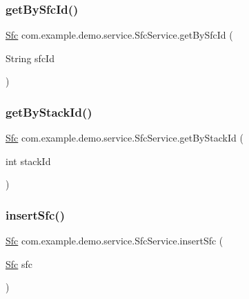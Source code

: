 \subsubsection{\texorpdfstring{get\+By\+Sfc\+Id()}{getBySfcId()}}
{\footnotesize\ttfamily \mbox{\hyperlink{classcom_1_1example_1_1demo_1_1modular_1_1_sfc}{Sfc}} com.\+example.\+demo.\+service.\+Sfc\+Service.\+get\+By\+Sfc\+Id (\begin{DoxyParamCaption}\item[{String}]{sfc\+Id }\end{DoxyParamCaption})}

\mbox{\label{classcom_1_1example_1_1demo_1_1service_1_1_sfc_service_a8f4c61c620524840b0a272fff71ea418}} 
\subsubsection{\texorpdfstring{get\+By\+Stack\+Id()}{getByStackId()}}
{\footnotesize\ttfamily \mbox{\hyperlink{classcom_1_1example_1_1demo_1_1modular_1_1_sfc}{Sfc}} com.\+example.\+demo.\+service.\+Sfc\+Service.\+get\+By\+Stack\+Id (\begin{DoxyParamCaption}\item[{int}]{stack\+Id }\end{DoxyParamCaption})}

\mbox{\label{classcom_1_1example_1_1demo_1_1service_1_1_sfc_service_a8ebb4e1dbee979c86c18f76db58bdc08}} 
\subsubsection{\texorpdfstring{insert\+Sfc()}{insertSfc()}}
{\footnotesize\ttfamily \mbox{\hyperlink{classcom_1_1example_1_1demo_1_1modular_1_1_sfc}{Sfc}} com.\+example.\+demo.\+service.\+Sfc\+Service.\+insert\+Sfc (\begin{DoxyParamCaption}\item[{\mbox{\hyperlink{classcom_1_1example_1_1demo_1_1modular_1_1_sfc}{Sfc}}}]{sfc }\end{DoxyParamCaption})}


